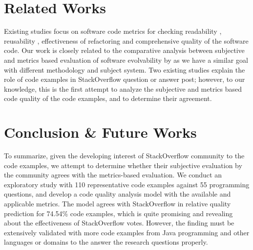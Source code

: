 \documentclass{sig-alternate}
\begin{document}
\section{Related Works}
\label{sec:related}
Existing studies focus on software code metrics for checking readability \cite{readability, simpler}, reusability \cite{reusability}, effectiveness of refactoring \cite{refactoring} and comprehensive quality \cite{ijert, lochmann, survey, foss, oss} of the software code. Our work is closely related to the comparative analysis between subjective and metrics based evaluation of software evolvability by \citet{subjective} as we have a similar goal with different methodology and subject system. Two existing studies \cite{nasehi, nier} explain the role of code examples in StackOverflow question or answer post; however, to our knowledge, this is the first attempt to analyze the subjective and metrics based code quality of the code examples, and to determine their agreement.


\section{Conclusion \& Future Works}
\label{sec:conclusion}
To summarize, given the developing interest of StackOverflow community to the code examples, we attempt to determine whether their subjective evaluation by the community agrees with the metrics-based evaluation. We conduct an exploratory study with 110 representative code examples against 55 programming questions, and develop a code quality analysis model with the available and applicable metrics. The model agrees with StackOverflow in relative quality prediction for 74.54\% code examples, which is quite promising and revealing about the effectiveness of StackOverflow votes. However, the finding must be extensively validated with more code examples from Java programming and other languages or domains to the answer the research questions properly.








\scriptsize
%
%
\end{document}
